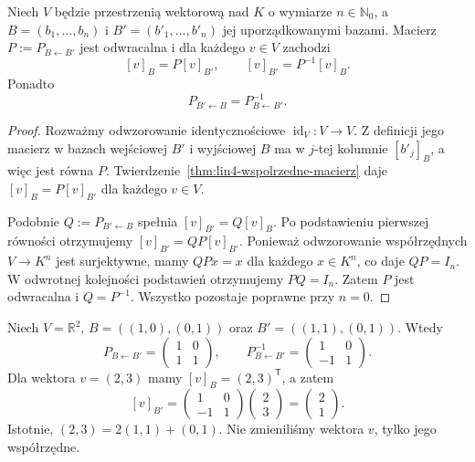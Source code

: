 \begin{twierdzenie}
\label{thm:lin4-zmiana-wspolrzednych}
Niech \(V\) będzie przestrzenią wektorową
nad \(K\) o wymiarze \(n\in\mathbb N_0\),
a \(B=(b_1,\ldots,b_n)\) i
\(B'=(b'_1,\ldots,b'_n)\) jej
uporządkowanymi bazami.
Macierz \(P:=P_{B\leftarrow B'}\)
jest odwracalna i dla każdego \(v\in V\)
zachodzi
\[
 [v]_B=P[v]_{B'},\qquad
 [v]_{B'}=P^{-1}[v]_B.
\]
Ponadto
\[
 P_{B'\leftarrow B}=P_{B\leftarrow B'}^{-1}.
\]
\end{twierdzenie}
\begin{proof}
Rozważmy odwzorowanie identycznościowe
\(\operatorname{id}_V\colon V\to V\).
Z definicji jego macierz w bazach
wejściowej \(B'\) i wyjściowej \(B\)
ma w \(j\)-tej kolumnie \([b'_j]_B\),
a więc jest równa \(P\).
Twierdzenie~\ref{thm:lin4-wspolrzedne-macierz}
daje
\([v]_B=P[v]_{B'}\) dla każdego \(v\in V\).

Podobnie \(Q:=P_{B'\leftarrow B}\)
spełnia \([v]_{B'}=Q[v]_B\).
Po podstawieniu pierwszej równości
otrzymujemy
\([v]_{B'}=QP[v]_{B'}\).
Ponieważ odwzorowanie współrzędnych
\(V\to K^n\) jest surjektywne,
mamy \(QP x=x\) dla każdego \(x\in K^n\),
co daje \(QP=I_n\).
W odwrotnej kolejności podstawień
otrzymujemy \(PQ=I_n\).
Zatem \(P\) jest odwracalna i \(Q=P^{-1}\).
Wszystko pozostaje poprawne przy \(n=0\).
\end{proof}

\begin{przyklad}
\label{prz:lin4-zmiana-wspolrzednych}
Niech \(V=\mathbb R^2\),
\(B=((1,0),(0,1))\) oraz
\(B'=((1,1),(0,1))\).
Wtedy
\[
 P_{B\leftarrow B'}
 =\begin{pmatrix}1&0\\1&1\end{pmatrix},
 \qquad
 P_{B\leftarrow B'}^{-1}
 =\begin{pmatrix}1&0\\-1&1\end{pmatrix}.
\]
Dla wektora \(v=(2,3)\) mamy
\([v]_B=(2,3)^{\mathsf T}\),
a zatem
\[
 [v]_{B'}=
 \begin{pmatrix}1&0\\-1&1\end{pmatrix}
 \begin{pmatrix}2\\3\end{pmatrix}
 =\begin{pmatrix}2\\1\end{pmatrix}.
\]
Istotnie, \((2,3)=2(1,1)+(0,1)\).
Nie zmieniliśmy wektora \(v\), tylko
jego współrzędne.
\end{przyklad}

